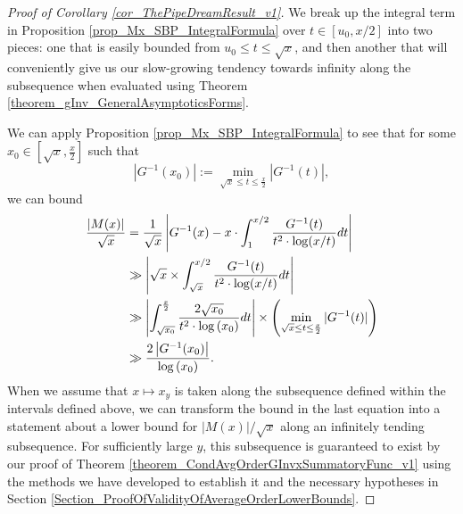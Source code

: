 \documentclass[11pt,reqno,a4letter]{article}
\numberwithin{figure}{section}
\numberwithin{table}{section}
\theoremstyle{plain}
\numberwithin{theorem}{section}
\theoremstyle{definition}
\begin{document}
\begin{proof}[Proof of Corollary \ref{cor_ThePipeDreamResult_v1}] 
\label{proofOf_cor_ThePipeDreamResult_v1} 
We break up the integral term in 
Proposition \ref{prop_Mx_SBP_IntegralFormula} 
over $t \in [u_0, x/2]$ into two pieces: one that is easily bounded 
from $u_0 \leq t \leq \sqrt{x}$, 
and then another that will conveniently give us our slow-growing tendency towards 
infinity along the subsequence when evaluated using 
Theorem \ref{theorem_gInv_GeneralAsymptoticsForms}. 

We can apply Proposition \ref{prop_Mx_SBP_IntegralFormula} to see that 
for some $x_0 \in \left[\sqrt{x}, \frac{x}{2}\right]$ such that 
\[
\left\lvert G^{-1}(x_0) \right\rvert := 
     \min_{\sqrt{x} \leq t \leq \frac{x}{2}} |G^{-1}(t)|, 
\]
we can bound 
\begin{align} 
\notag 
\frac{|M(x)|}{\sqrt{x}} & = 
     \frac{1}{\sqrt{x}} \left\lvert G^{-1}(x) - x \cdot \int_1^{x/2} \frac{G^{-1}(t)}{ 
     t^2 \cdot \log(x/t)} dt \right\rvert \\ 
\notag 
     & \gg 
     \left\lvert \sqrt{x} \times \int_{\sqrt{x}}^{x/2} \frac{G^{-1}(t)}{ 
     t^2 \cdot \log(x/t)} dt \right\rvert \\ 
\notag 
     & \gg \left\lvert \int_{\sqrt{x_0}}^{\frac{x}{2}} \frac{2 \sqrt{x_0}}{ 
     t^2 \cdot \log\left(x_0\right)} dt \right\rvert 
     \times \left( 
     \min_{\sqrt{x} \leq t \leq \frac{x}{2}} |G^{-1}(t)| 
     \right) \\ 
\label{eqn_MxGInvxLowerBound_stmt_v1} 
     & \gg  
     \frac{2 \left\lvert G^{-1}(x_0) \right\rvert}{\log\left(x_0\right)}. 
\end{align} 
When we assume that $x \mapsto x_y$ is taken along the 
subsequence defined within the intervals defined above, we can transform the bound in the last 
equation into a statement about a lower bound for $|M(x)| / \sqrt{x}$ along an infinitely tending 
subsequence. 
For sufficiently large $y$, this subsequence is guaranteed to exist by our proof of 
Theorem \ref{theorem_CondAvgOrderGInvxSummatoryFunc_v1} 
using the methods we have developed to establish it and the necessary hypotheses in 
Section \ref{Section_ProofOfValidityOfAverageOrderLowerBounds}. 


\end{proof}
\end{document}
